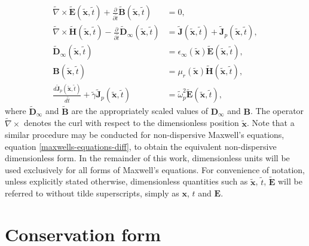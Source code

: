 \begin{subequations}
    \label{eq:dimensionless-maxwell}
    \begin{align}
        \tilde{\nabla} \times \tilde{\mathbf{E}}(\tilde{\mathbf{x}},\tilde{t}) + \frac{\partial }{\partial \tilde{t}} \tilde{\mathbf{B}}(\tilde{\mathbf{x}}, \tilde{t}) &= 0, \\
        \tilde{\nabla} \times \tilde{\mathbf{H}}(\tilde{\mathbf{x}},\tilde{t}) - \frac{\partial }{\partial \tilde{t}} \tilde{\mathbf{D}}_{\infty}(\tilde{\mathbf{x}}, \tilde{t}) &= \tilde{\mathbf{J}}(\tilde{\mathbf{x}},\tilde{t}) + \tilde{\mathbf{J}}_p(\tilde{\mathbf{x}},\tilde{t}), \\
        \tilde{\mathbf{D}}_{\infty}(\tilde{\mathbf{x}},\tilde{t}) &= \epsilon_{\infty}(\tilde{\mathbf{x}}) \tilde{\mathbf{E}}(\tilde{\mathbf{x}},\tilde{t}), \\
        \mathbf{B}(\tilde{\mathbf{x}},\tilde{t}) &= \mu_r(\tilde{\mathbf{x}}) \tilde{\mathbf{H}}(\tilde{\mathbf{x}},\tilde{t}), \\
        \frac{d \tilde{\mathbf{J}}_p(\tilde{\mathbf{x}},\tilde{t})}{d\tilde{t}} + \tilde{\gamma} \tilde{\mathbf{J}}_p(\tilde{\mathbf{x}},\tilde{t}) &= \tilde{\omega}_p^2 \tilde{\mathbf{E}}(\tilde{\mathbf{x}},\tilde{t}),
    \end{align}
\end{subequations}
where $\tilde{\mathbf{D}}_{\infty}$ and $\tilde{\mathbf{B}}$ are the appropriately scaled values of $\mathbf{D}_{\infty}$ and $\mathbf{B}$. The operator $\tilde{\nabla} \times$ denotes the curl with respect to the dimensionless position $\tilde{\mathbf{x}}$. Note that a similar procedure may be conducted for non-dispersive Maxwell's equations, equation \ref{maxwells-equations-diff}, to obtain the equivalent non-dispersive dimensionless form.
In the remainder of this work, dimensionless units will be used exclusively for all forms of Maxwell's equations. For convenience of notation, unless explicitly stated otherwise, dimensionless quantities such as $\tilde{\mathbf{x}}$, $\tilde{t}$, $\tilde{\mathbf{E}}$ will be referred to without tilde superscripts, simply as $\mathbf{x}$, $t$ and $\mathbf{E}$.

\section{Conservation form}

